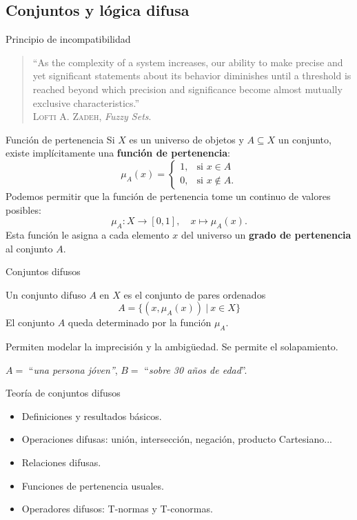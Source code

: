 \documentclass[spanish]{beamer}
\begin{document}
\subsection{Conjuntos y lógica difusa}

\begin{frame}{Principio de incompatibilidad}
\begin{quote}
	``As the complexity of a system increases, our ability to make precise and yet significant statements about its behavior diminishes until a threshold is reached beyond which precision and significance become almost mutually exclusive characteristics.''\\
	\vspace{1em}
	\textsc {Lofti A. Zadeh}, \textit{Fuzzy Sets}.
\end{quote}
\end{frame}

\begin{frame}{Función de pertenencia}
	Si $X$ es un universo de objetos y $A \subseteq X$ un conjunto, existe implícitamente una \textbf{función de pertenencia}:
\[ \mu_A(x) =
\begin{cases}
	1, & \text{si } x \in A\\
	0, & \text{si } x \notin A.
\end{cases}
\]
\pause
Podemos permitir que la función de pertenencia tome un continuo de valores posibles:
\[
\mu_A : X \longrightarrow [0,1], \quad x \mapsto \mu_A(x).
\]
Esta función le asigna a cada elemento $x$ del universo un \textbf{grado de pertenencia} al conjunto $A$.
\end{frame}

\begin{frame}{Conjuntos difusos}
\begin{definition}
	Un conjunto difuso $A$ en $X$ es el conjunto de pares ordenados
\[
A = \{ (x, \mu_A(x)) \ | \ x \in X \}
\]
El conjunto $A$ queda determinado por la función $\mu_A$.
\end{definition}
\pause
\vspace{1em}
Permiten modelar la imprecisión y la ambigüedad. Se permite el solapamiento.
\begin{example}
	$A =$ ``\textit{una persona jóven''}, $B=$ ``\textit{sobre 30 años de edad}''.
\end{example}
\end{frame}

\begin{frame}{Teoría de conjuntos difusos}

  \begin{itemize}[<+->]
    \item Definiciones y resultados básicos.
    \item Operaciones difusas: unión, intersección, negación, producto Cartesiano...
    \item Relaciones difusas.
    \item Funciones de pertenencia usuales.
    \item Operadores difusos: T-normas y T-conormas.
  \end{itemize}
\end{frame}
\end{document}
